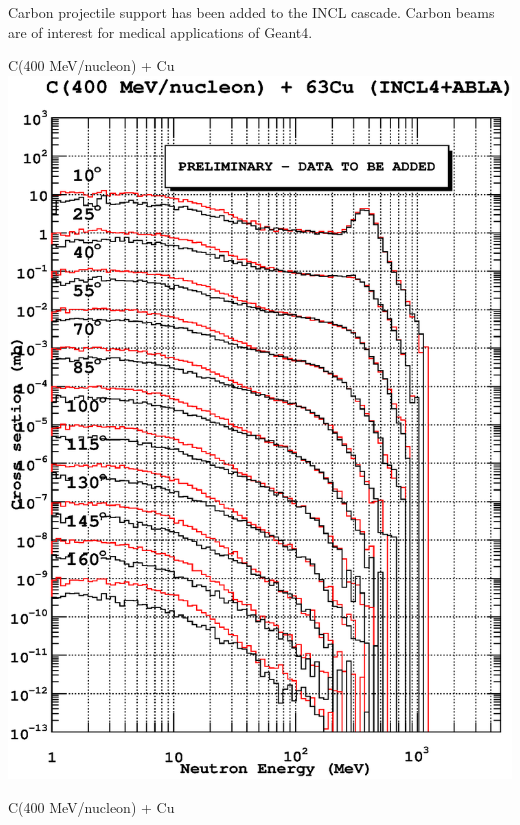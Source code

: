 \documentclass[20pt]{article}
\newenvironment{textbox}
{\begin{lrbox}{\dummybox}\begin{minipage}{0.9\columnwidth}}
{\end{minipage}\end{lrbox}\raisebox{-\depth}{\psshadowbox[framesep=1em,framearc=.1,shadow=true]{\usebox{\dummybox}}}\vspace{0.005\textheight}}
\begin{document}
\begin{center}
\begin{multicols}{3}
\begin{textbox}
{Carbon projectile support has been added to the {\sf INCL}
cascade. Carbon beams are of interest for medical applications of {\sf
Geant4}.

\begin{center}
{\Huge {\sf C(400 MeV/nucleon) + Cu}}
\includegraphics[scale=0.6,angle=0]{images/carbonCopper.eps}
\end{center}
\begin{center}
{\Huge {\sf C(400 MeV/nucleon) + Cu}}

\end{center}}
\end{textbox}
\end{multicols}
\end{center}
\end{document}

